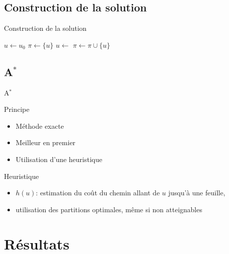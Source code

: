 \documentclass[tikz]{beamer}
\begin{document}
\subsection{Construction de la solution}
\begin{frame}[c]{Construction de la solution}
  \begin{algorithmic}
    \State{}\(u \gets u_0\)
    \State{}\(\pi \gets \{u\}\)
    \State{}
    \State{}\(u \gets\) 
    \State{}\(\pi \gets \pi \cup \{u\}\)
    \EndFor{}
    \State{}\Return{$\pi$}
    \EndFunction{}
  \end{algorithmic}
\end{frame}

\subsection{A\(^*\)}
\begin{frame}[c]{A\(^*\)}
  \begin{block}{Principe}
    \begin{itemize}
      \item Méthode exacte
      \item Meilleur en premier
      \item Utilisation d'une heuristique
    \end{itemize}
  \end{block}
  \begin{block}{Heuristique}
    \begin{itemize}
      \item \(h(u)\): estimation du coût du chemin allant de \(u\)
        jusqu'à une feuille,
      \item utilisation des partitions optimales, même si non atteignables
    \end{itemize}
  \end{block}
\end{frame}

\section{Résultats}
\end{document}
